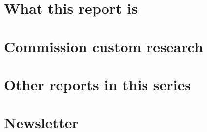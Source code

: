 \documentclass[11pt,letterpaper]{report}
\begin{document}
\chapter*{What this report is}
\label{sec:org56a504f}
\chapter*{Commission custom research}
\label{sec:org6e0bf28}
\chapter*{Other reports in this series}
\label{sec:orgcffc9ea}
\chapter*{Newsletter}
\label{sec:org94e4204}
\end{document}
